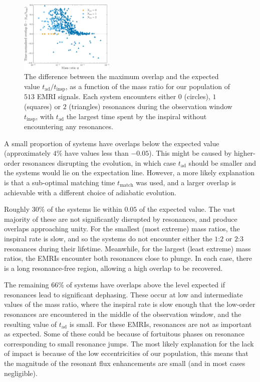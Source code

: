 \documentclass[aps,prd,amsfonts,amssymb,amsmath,nofootinbib,showpacs,superscriptaddress,twocolumn,floatfix]{revtex4-1}
\newcommand{\sub}[1]{\ensuremath{_\mathrm{#1}}}
\begin{document}
\begin{figure}
\centering
\includegraphics[width=0.4\textwidth]{Fig_res_overlap_t}
\caption{\label{fig:pop-adSNR-vs-eta}The difference between the maximum overlap and the expected value $t\sub{ad} / t\sub{insp}$, as a function of the mass ratio for our population of $513$ EMRI signals. Each system encounters either $0$ (circles), $1$ (squares) or $2$ (triangles) resonances during the observation window $t\sub{insp}$, with $t\sub{ad}$ the largest time spent by the inspiral without encountering any resonances.}
\end{figure}

A small proportion of systems have overlaps below the expected value (approximately $4\%$ have values less than $-0.05$). This might be caused by higher-order resonances disrupting the evolution, in which case $t\sub{ad}$ should be smaller and the systems would lie on the expectation line. However, a more likely explanation is that a sub-optimal matching time $t\sub{match}$ was used, and a larger overlap is achievable with a different choice of adiabatic evolution.

Roughly $30\%$ of the systems lie within $0.05$ of the expected value. The vast majority of these are not significantly disrupted by resonances, and produce overlaps approaching unity. For the smallest (most extreme) mass ratios, the inspiral rate is slow, and so the systems do not encounter either the $1$:$2$ or $2$:$3$ resonances during their lifetime. Meanwhile, for the largest (least extreme) mass ratios, the EMRIs encounter both resonances close to plunge. In each case, there is a long resonance-free region, allowing a high overlap to be recovered.

The remaining $66\%$ of systems have overlaps above the level expected if resonances lead to significant dephasing. These occur at low and intermediate values of the mass ratio, where the inspiral rate is slow enough that the low-order resonances are encountered in the middle of the observation window, and the resulting value of $t\sub{ad}$ is small. For these EMRIs, resonances are not as important as expected. Some of these could be because of fortuitous phases on resonance corresponding to small resonance jumps. The most likely explanation for the lack of impact is because of the low eccentricities of our population, this means that the magnitude of the resonant flux enhancements are small (and in most cases negligible).
\end{document}
